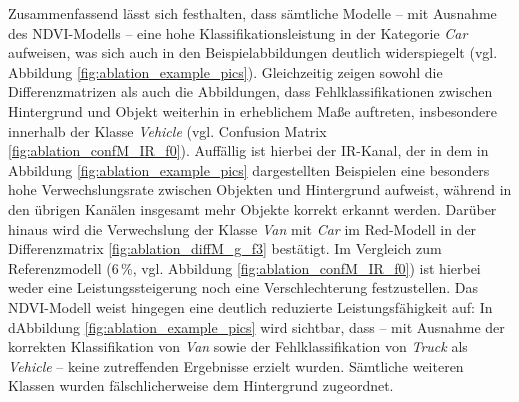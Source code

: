 Zusammenfassend lässt sich festhalten, dass sämtliche Modelle – mit Ausnahme des NDVI-Modells – eine hohe Klassifikationsleistung in der Kategorie \textit{Car} aufweisen, was sich auch in den Beispielabbildungen deutlich widerspiegelt (vgl. Abbildung \ref{fig:ablation_example_pics}). Gleichzeitig zeigen sowohl die Differenzmatrizen als auch die Abbildungen, dass Fehlklassifikationen zwischen Hintergrund und Objekt weiterhin in erheblichem Maße auftreten, insbesondere innerhalb der Klasse \textit{Vehicle} (vgl. Confusion Matrix \ref{fig:ablation_confM_IR_f0}). Auffällig ist hierbei der IR-Kanal, der in dem in Abbildung \ref{fig:ablation_example_pics} dargestellten Beispielen eine besonders hohe Verwechslungsrate zwischen Objekten und Hintergrund aufweist, während in den übrigen Kanälen insgesamt mehr Objekte korrekt erkannt werden. Darüber hinaus wird die Verwechslung der Klasse \textit{Van} mit \textit{Car} im Red-Modell in der Differenzmatrix \ref{fig:ablation_diffM_g_f3} bestätigt. Im Vergleich zum Referenzmodell (6\,\%, vgl. Abbildung \ref{fig:ablation_confM_IR_f0}) ist hierbei weder eine Leistungssteigerung noch eine Verschlechterung festzustellen. Das NDVI-Modell weist hingegen eine deutlich reduzierte Leistungsfähigkeit auf: In dAbbildung \ref{fig:ablation_example_pics} wird sichtbar, dass – mit Ausnahme der korrekten Klassifikation von \textit{Van} sowie der Fehlklassifikation von \textit{Truck} als \textit{Vehicle} – keine zutreffenden Ergebnisse erzielt wurden. Sämtliche weiteren Klassen wurden fälschlicherweise dem Hintergrund zugeordnet.




